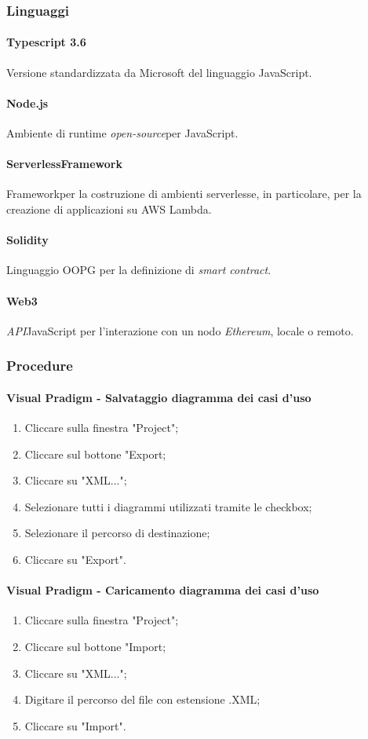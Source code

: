 \newpage \subsubsection{Linguaggi}
\paragraph{Typescript 3.6}
Versione standardizzata da Microsoft del linguaggio JavaScript.

\paragraph{Node.js}
Ambiente di runtime \textit{open-source}\glo per JavaScript.

\paragraph{Serverless\glo Framework\glo}
Framework\glo per la costruzione di ambienti serverless\glos e, in particolare, per la creazione di applicazioni su AWS Lambda.

\paragraph{Solidity}
Linguaggio OOPG per la definizione di \textit{smart contract}\glos.

\paragraph{Web3}
\textit{API}\glo JavaScript per l’interazione con un nodo \textit{Ethereum\glos}, locale o remoto.\\

\subsubsection{Procedure}
\paragraph{Visual Pradigm - Salvataggio diagramma dei casi d'uso}
\begin{enumerate}
	\item Cliccare sulla finestra "Project";
	\item Cliccare sul bottone "Export;
	\item Cliccare su "XML...";
	\item Selezionare tutti i diagrammi utilizzati tramite le checkbox;
	\item Selezionare il percorso di destinazione;
	\item Cliccare su "Export".
\end{enumerate}

\paragraph{Visual Pradigm - Caricamento diagramma dei casi d'uso}
\begin{enumerate}
	\item Cliccare sulla finestra "Project";
	\item Cliccare sul bottone "Import;
	\item Cliccare su "XML...";
	\item Digitare il percorso del file con estensione .XML;
	\item Cliccare su "Import".
\end{enumerate}